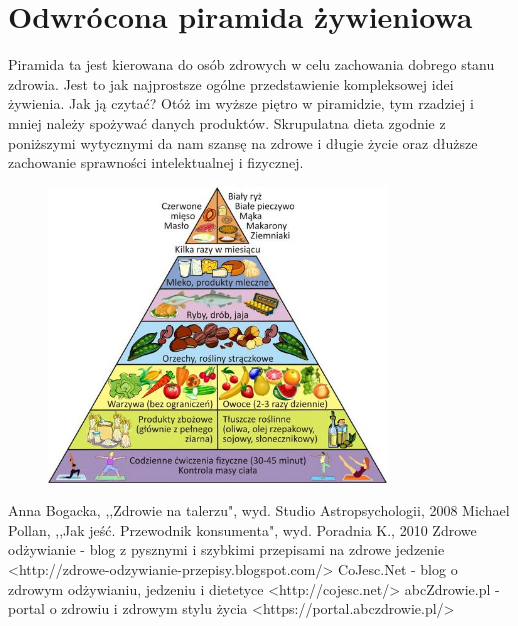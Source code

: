 \documentclass{article}
\begin{document}
\section{Odwrócona piramida żywieniowa}
Piramida ta jest kierowana do osób zdrowych w celu zachowania dobrego stanu zdrowia. Jest to jak najprostsze ogólne przedstawienie kompleksowej idei żywienia. Jak ją czytać? Otóż im wyższe piętro w piramidzie, tym rzadziej i mniej należy spożywać danych produktów. Skrupulatna dieta zgodnie z poniższymi wytycznymi da nam szansę na zdrowe i długie życie oraz dłuższe zachowanie sprawności intelektualnej i fizycznej.
\newline
\begin{figure}[h]
\begin{center}
\includegraphics[width=0.8\textwidth]{piramida.jpg} \label{piramid}
\end{center}
\end{figure}
\newpage
\begin{thebibliography}{4}
 Anna Bogacka, ,,Zdrowie na talerzu", wyd. Studio Astropsychologii, 2008
 Michael Pollan, ,,Jak jeść. Przewodnik konsumenta", wyd. Poradnia K., 2010
 Zdrowe odżywianie - blog z pysznymi i szybkimi przepisami na zdrowe jedzenie <http://zdrowe-odzywianie-przepisy.blogspot.com/>
 CoJesc.Net - blog o zdrowym odżywianiu, jedzeniu i dietetyce <http://cojesc.net/>
 abcZdrowie.pl - portal o zdrowiu i zdrowym stylu życia <https://portal.abczdrowie.pl/>
\end{thebibliography}
\end{document}
